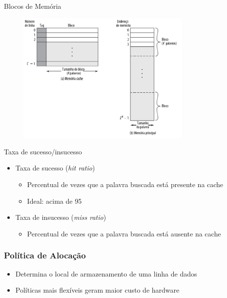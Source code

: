 \documentclass[aspectratio=169,
				xcolor=table]{beamer}
\begin{document}
	\begin{frame}{Blocos de Memória}

		\begin{figure}[hbtp]
			\centering
			\includegraphics[height=6.5cm, keepaspectratio]{../figs/cap06/blocosCache.png}
		\end{figure}		
	\end{frame}
	
	\begin{frame}{Taxa de sucesso/insucesso}

		\begin{itemize}
			\item Taxa de sucesso (\textit{hit ratio})
			\begin{itemize}
				\item Percentual de vezes que a palavra buscada está presente na cache
				\item Ideal: acima de 95%
			\end{itemize}			
			\vspace{1em}
			\item Taxa de insucesso (\textit{miss ratio})
			\begin{itemize}
				\item Percentual de vezes que a palavra buscada está ausente na cache				
			\end{itemize}
		\end{itemize}	
	
	\end{frame}
	
	\begin{frame}
		\frametitle{Política de Alocação}
		\begin{itemize}
			\item Determina o local de armazenamento de uma linha de dados
			\vspace{1em}
			\item Políticas mais flexíveis geram maior custo de hardware
		\end{itemize}
	\end{frame}
	
\end{document}
